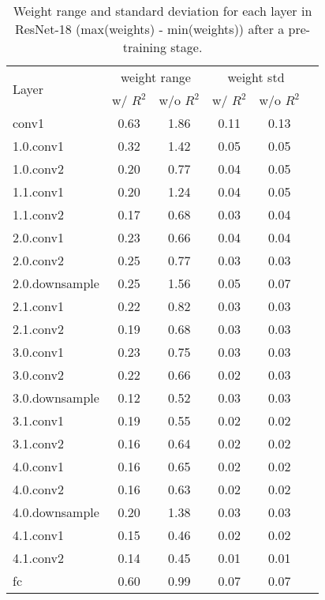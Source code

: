 \documentclass[10pt,twocolumn,letterpaper]{article}
\begin{document}
\begin{table}[t]
\caption{Weight range and standard deviation for each layer in ResNet-18 (max(weights) - min(weights)) after a pre-training stage.} \label{table_resnet_dist}
\vskip 0.15in
\begin{center}
\begin{small}
\begin{sc}
\begin{tabular}{lccccc}
\toprule
\multirow{2}{*}{Layer} & \multicolumn{2}{c}{weight range} & \multicolumn{2}{c}{weight std}\\
 & w/ $R^{2}$ & w/o $R^{2}$ & w/ $R^{2}$ & w/o $R^{2}$\\
\midrule
conv1 &  0.63 & 1.86 & 0.11 & 0.13\\
1.0.conv1 &   0.32 & 1.42 & 0.05 & 0.05 \\
1.0.conv2 &   0.20 & 0.77 & 0.04 & 0.05 \\
1.1.conv1 &   0.20 & 1.24 & 0.04 & 0.05 \\
1.1.conv2 &   0.17 & 0.68 & 0.03 & 0.04 \\
2.0.conv1 &   0.23 & 0.66 & 0.04 & 0.04 \\
2.0.conv2 &   0.25 & 0.77 & 0.03 & 0.03 \\
2.0.downsample &   0.25 & 1.56 & 0.05 & 0.07 \\
2.1.conv1 &   0.22 & 0.82 & 0.03 & 0.03 \\
2.1.conv2 &   0.19 & 0.68 & 0.03 & 0.03 \\
3.0.conv1 &   0.23 & 0.75 & 0.03 & 0.03 \\
3.0.conv2 &   0.22 & 0.66 & 0.02 & 0.03 \\
3.0.downsample &   0.12 & 0.52 & 0.03 & 0.03 \\
3.1.conv1 &   0.19 & 0.55 & 0.02 & 0.02 \\
3.1.conv2 &   0.16 & 0.64 & 0.02 & 0.02 \\
4.0.conv1 &   0.16 & 0.65 & 0.02 & 0.02 \\
4.0.conv2 &   0.16 & 0.63 & 0.02 & 0.02 \\
4.0.downsample &   0.20 & 1.38 & 0.03 & 0.03 \\
4.1.conv1 &   0.15 & 0.46 & 0.02 & 0.02 \\
4.1.conv2 &   0.14 & 0.45 & 0.01 & 0.01 \\
fc &   0.60 & 0.99 & 0.07 & 0.07 \\






\bottomrule
\end{tabular}
\end{sc}
\end{small}
\end{center}
\vskip -0.1in
\end{table}
\end{document}
